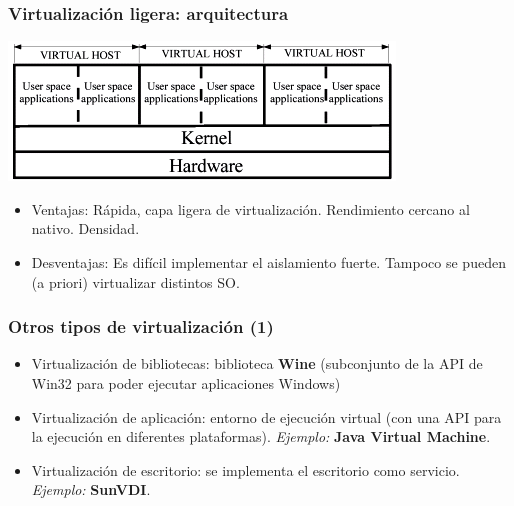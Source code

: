 \documentclass{beamer}
\begin{document}
\begin{frame}
\frametitle{Virtualización ligera: arquitectura}
\begin{center}
\includegraphics[scale=0.50,clip=false]{figs/armitage2.png}
\end{center}

\begin{itemize}
\item \alert{Ventajas:} Rápida, capa ligera de virtualización. Rendimiento cercano al nativo. Densidad.
\item \alert{Desventajas:} Es difícil implementar el aislamiento fuerte. Tampoco se pueden (a priori) virtualizar distintos SO.
\end{itemize}

\end{frame}




\begin{frame}
\frametitle{Otros tipos de virtualización (1)}

\begin{itemize}
\item \alert{Virtualización de bibliotecas:} biblioteca \textbf{Wine} (subconjunto de la API de Win32 para poder ejecutar aplicaciones Windows)
\item \alert{Virtualización de aplicación:} entorno de ejecución virtual (con una API para la ejecución en diferentes plataformas). \textit{Ejemplo:} \textbf{Java Virtual Machine}.
\item \alert{Virtualización de escritorio:} se implementa el escritorio como servicio. \textit{Ejemplo:} \textbf{SunVDI}.
\end{itemize}

\end{frame}

\end{document}
